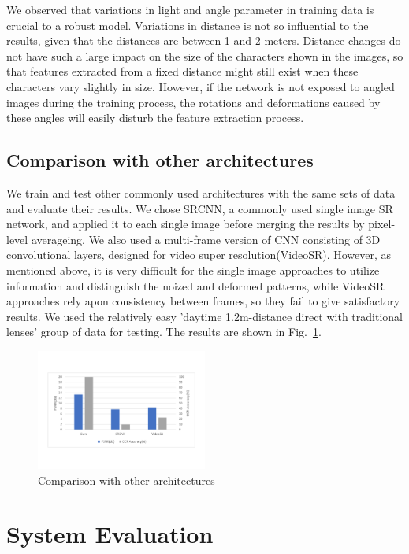 We observed that variations in light and angle parameter in training data is crucial to a robust model. Variations in distance is not so influential to the results, given that the distances are between 1 and 2 meters. Distance changes do not have such a large impact on the size of the characters shown in the images, so that features extracted from a fixed distance might still exist when these characters vary slightly in size. However, if the network is not exposed to angled images during the training process, the rotations and deformations caused by these angles will easily disturb the feature extraction process.

\subsection{Comparison with other architectures}
We train and test other commonly used architectures with the same sets of data and evaluate their results. We chose SRCNN, a commonly used single image SR network, and applied it to each single image before merging the results by pixel-level averageing. We also used a multi-frame version of CNN consisting of 3D convolutional layers, designed for video super resolution(VideoSR). However, as mentioned above, it is very difficult for the single image approaches to utilize information and distinguish the noized and deformed patterns, while VideoSR approaches rely apon consistency between frames, so they fail to give satisfactory results. We used the relatively easy 'daytime 1.2m-distance direct with traditional lenses' group of data for testing. The results are shown in Fig.~\ref{table-comp}.

\begin{figure}
 \centering
    \includegraphics[width=0.5\textwidth]{./pic/table4.pdf}
    \caption{Comparison with other architectures}
    \label{table-comp}
\end{figure}

\section{System Evaluation}

